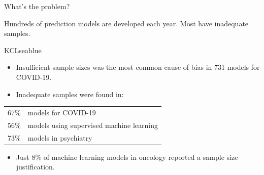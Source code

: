 \documentclass[11pt]{beamer}
\begin{document}
\begin{frame}[t]{What's the problem?}


	Hundreds of prediction models are developed each year. Most have
	inadequate samples.

	\begin{cbox}{KCLseablue}{}
		\large
		\begin{itemize}
			\item Insufficient sample sizes was the most common cause of bias
			      in 731 models for COVID-19.\autocite{wynants2020}
			\item Inadequate samples were found in: \vspace{0.5em}
		\end{itemize}
		\begin{tabular}{lp{}}
			{\Huge \alert{67\%}} & models for COVID-19\autocite{wynants2020}                      \\[0.5em]
			{\Huge \alert{56\%}} & models using supervised machine learning\autocite{navarro2021} \\[0.5em]
			{\Huge \alert{73\%}} & models in psychiatry\autocite{meehan2022}                      \\[0.3em]
		\end{tabular}
		\begin{itemize}
			\item Just \alert{8\%} of machine learning models in oncology
			      reported a sample size justification\autocite{dhiman2022}.
		\end{itemize}
	\end{cbox}
\end{frame}
\end{document}
